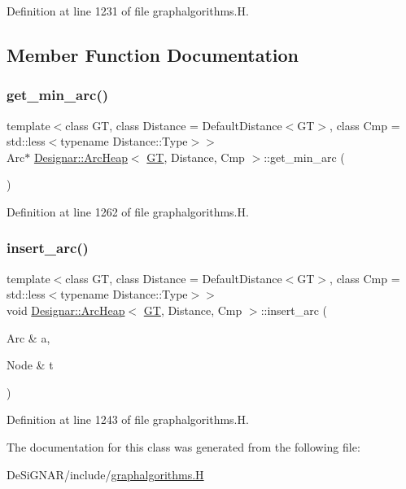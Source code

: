 Definition at line 1231 of file graphalgorithms.\+H.



\subsection{Member Function Documentation}
\mbox{\label{class_designar_1_1_arc_heap_aa97981f64e6a7868d4d8b310bfd6b1cb}} 
\subsubsection{\texorpdfstring{get\+\_\+min\+\_\+arc()}{get\_min\_arc()}}
{\footnotesize\ttfamily template$<$class GT, class Distance = Default\+Distance$<$\+G\+T$>$, class Cmp = std\+::less$<$typename Distance\+::\+Type$>$$>$ \\
Arc$\ast$ \hyperlink{class_designar_1_1_arc_heap}{Designar\+::\+Arc\+Heap}$<$ \hyperlink{demo-buildgraph_8_c_a3001c40d2c31ca87ed96cd7d1334a55e}{GT}, Distance, Cmp $>$\+::get\+\_\+min\+\_\+arc (\begin{DoxyParamCaption}{ }\end{DoxyParamCaption})\hspace{0.3cm}{\ttfamily [inline]}}



Definition at line 1262 of file graphalgorithms.\+H.

\mbox{\label{class_designar_1_1_arc_heap_a578a5310c000e671cb967799317f534d}} 
\subsubsection{\texorpdfstring{insert\+\_\+arc()}{insert\_arc()}}
{\footnotesize\ttfamily template$<$class GT, class Distance = Default\+Distance$<$\+G\+T$>$, class Cmp = std\+::less$<$typename Distance\+::\+Type$>$$>$ \\
void \hyperlink{class_designar_1_1_arc_heap}{Designar\+::\+Arc\+Heap}$<$ \hyperlink{demo-buildgraph_8_c_a3001c40d2c31ca87ed96cd7d1334a55e}{GT}, Distance, Cmp $>$\+::insert\+\_\+arc (\begin{DoxyParamCaption}\item[{Arc \&}]{a,  }\item[{Node \&}]{t }\end{DoxyParamCaption})\hspace{0.3cm}{\ttfamily [inline]}}



Definition at line 1243 of file graphalgorithms.\+H.



The documentation for this class was generated from the following file\+:\begin{DoxyCompactItemize}
\item 
De\+Si\+G\+N\+A\+R/include/\hyperlink{graphalgorithms_8_h}{graphalgorithms.\+H}\end{DoxyCompactItemize}
